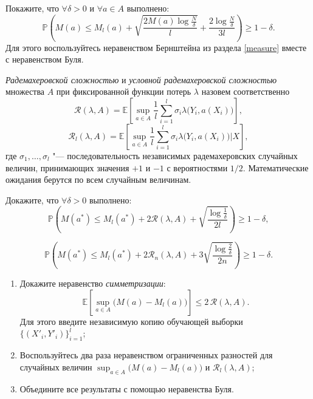 \begin{ordre}
Покажите, что $\forall \delta > 0$ и $\forall a \in A$ выполнено:
\[
\mathbb{P} \left(
M(a) \leqslant M_l(a) + \sqrt{\frac{2M(a)\log\frac{N}{\delta}}{l}} + \frac{2\log\frac{N}{\delta}}{3l}
\right)
\geq 1-\delta.
\]
Для этого воспользуйтесь неравенством Бернштейна из раздела \ref{measure} вместе с неравенством Буля.

\end{ordre}


\begin{problem}
{\it Радемахеровской сложностью} и {\it условной радемахеровской сложностью} множества $A$ при фиксированной функции потерь $\lambda$ назовем соответственно
\[
\mathcal{R}(\lambda,  A) = 
\mathbb{E}\left[ \sup_{a\in A}
\frac{1}{l}\sum_{i=1}^l \sigma_i \lambda\bigl(Y_i,a(X_i)\bigr)
\right],
\]
\[
\mathcal{R}_l(\lambda,  A) = 
\mathbb{E}\left[ \sup_{a \in A}
\frac{1}{l}\sum_{i=1}^l \sigma_i \lambda\bigl(Y_i,a(X_i)\bigr)\Big| X
\right],
\]
где $\sigma_1,\dots,\sigma_l$ "--- последовательность независимых радемахеровских случайных величин, принимающих значения $+1$ и $-1$ с вероятностями $1/2$. Математические ожидания берутся по всем случайным величинам.

Докажите, что $\forall \delta > 0$ выполнено:
\begin{equation}
\label{eq:radem}
\mathbb{P} \left(
M(a^*) \leqslant M_l(a^*) + 2\mathcal{R}(\lambda,  A) + \sqrt{\frac{\log \frac{1}{\delta}}{2l}}
\right)
\geq 1-\delta,
\end{equation}

\begin{equation}
\label{eq:condradem}
\mathbb{P} \left(
M(a^*) \leqslant M_l(a^*) + 2\mathcal{R}_n(\lambda,  A) + 3\sqrt{\frac{\log \frac{2}{\delta}}{2n}}
\right)
\geq 1-\delta.
\end{equation}

\end{problem}

\begin{ordre}

\begin{enumerate}

\item Докажите неравенство {\it симметризации}:
\[
\mathbb{E}\left[\sup_{a\in A}\bigl(M(a)  - M_l(a) \bigr)\right]
\leqslant
2\,\mathcal{R}(\lambda,  A).
\]
Для этого введите независимую копию обучающей выборки \\ $\{(X'_i,Y'_i)\}_{i=1}^l$;

\item Воспользуйтесь два раза неравенством ограниченных разностей для случайных величин $\sup_{a \in A}\bigl(M(a) - M_l(a)\bigr)$ и
$\mathcal{R}_l(\lambda,  A)$;

\item Объедините все результаты с помощью неравенства Буля.

\end{enumerate}

\end{ordre}

